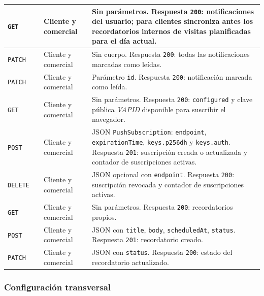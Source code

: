 {\begin{supertabular}{|A{0.10\textwidth}|A{0.27\textwidth}|A{0.15\textwidth}|A{0.38\textwidth}|}
\hline
\texttt{GET} &  & Cliente y comercial & Sin parámetros. Respuesta \texttt{200}: notificaciones del usuario; para clientes sincroniza antes los recordatorios internos de visitas planificadas para el día actual.\\
\hline
\texttt{PATCH} &  & Cliente y comercial & Sin cuerpo. Respuesta \texttt{200}: todas las notificaciones marcadas como leídas.\\
\hline
\texttt{PATCH} &  & Cliente y comercial & Parámetro \texttt{id}. Respuesta \texttt{200}: notificación marcada como leída.\\
\hline
\texttt{GET} &  & Cliente y comercial & Sin parámetros. Respuesta \texttt{200}: \texttt{configured} y clave pública \textit{VAPID} disponible para suscribir el navegador.\\
\hline
\texttt{POST} &  & Cliente y comercial & JSON \texttt{PushSubscription}: \texttt{endpoint}, \texttt{expirationTime}, \texttt{keys.p256dh} y \texttt{keys.auth}. Respuesta \texttt{201}: suscripción creada o actualizada y contador de suscripciones activas.\\
\hline
\texttt{DELETE} &  & Cliente y comercial & JSON opcional con \texttt{endpoint}. Respuesta \texttt{200}: suscripción revocada y contador de suscripciones activas.\\
\hline
\texttt{GET} &  & Cliente y comercial & Sin parámetros. Respuesta \texttt{200}: recordatorios propios.\\
\hline
\texttt{POST} &  & Cliente y comercial & JSON con \texttt{title}, \texttt{body}, \texttt{scheduledAt}, \texttt{status}. Respuesta \texttt{201}: recordatorio creado.\\
\hline
\texttt{PATCH} &  & Cliente y comercial & JSON con \texttt{status}. Respuesta \texttt{200}: estado del recordatorio actualizado.\\
\hline
\end{supertabular}
}

\subsubsection{Configuración transversal}


